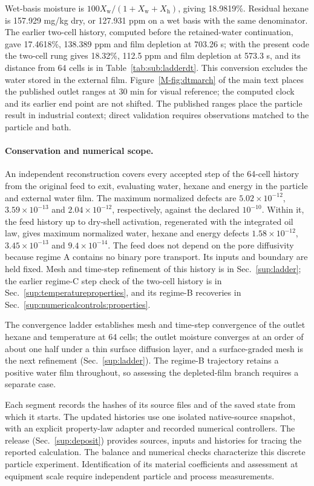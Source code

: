 Wet-basis moisture is $100X_{\mathrm w}/(1+X_{\mathrm w}+X_{\mathrm h})$,
giving 18.9819\%. Residual hexane is 157.929 mg/kg dry, or 127.931 ppm
on a wet basis with the same denominator. The earlier two-cell history,
computed before the retained-water continuation, gave 17.4618\%, 138.389 ppm and
film depletion at 703.26 s; with the present code the two-cell rung gives
18.32\%, 112.5 ppm and film depletion at 573.3 s, and its distance from
64 cells is in Table~\ref{tab:sub:ladderdt}. This conversion excludes the water
stored in the external film. Figure~\ref*{M-fig:dtmarch} of the main text
places the published outlet ranges at 30 min for visual reference; the
computed clock and its earlier end point are not shifted. The published ranges place the particle result in industrial context;
direct validation requires observations matched to the particle and bath.

\paragraph{Conservation and numerical scope.}
An independent reconstruction covers every accepted step of the 64-cell
history from the original feed to exit, evaluating water, hexane and
energy in the particle and external water film. The maximum normalized
defects are $5.02\times10^{-12}$, $3.59\times10^{-13}$ and
$2.04\times10^{-12}$, respectively, against the declared $10^{-10}$.
Within it, the feed history up to dry-shell activation, regenerated with
the integrated oil law, gives maximum normalized water, hexane and energy
defects $1.58\times10^{-12}$, $3.45\times10^{-13}$ and
$9.4\times10^{-14}$. The feed does not depend on the pore diffusivity
because regime A contains no binary pore transport. Its inputs and
boundary are held fixed.
Mesh and time-step refinement of this history is in Sec.~\ref{sup:ladder};
the earlier regime-C step check of the two-cell history is in
Sec.~\ref{sup:temperatureproperties}, and its regime-B recoveries in
Sec.~\ref{sup:numericalcontrols:properties}.

The convergence ladder establishes mesh and time-step convergence of the
outlet hexane and temperature at 64 cells; the outlet moisture converges
at an order of about one half under a thin surface diffusion layer, and a
surface-graded mesh is the next refinement (Sec.~\ref{sup:ladder}).
The regime-B trajectory retains a positive water film throughout, so assessing
the depleted-film branch requires a separate case.

Each segment records the hashes of its source files and of the saved
state from which it starts. The updated histories use one isolated native-source
snapshot, with an explicit property-law adapter and recorded numerical controllers. The release
(Sec.~\ref{sup:deposit}) provides sources, inputs and histories for tracing
the reported calculation. The balance and numerical checks characterize this
discrete particle experiment. Identification of its material coefficients
and assessment at equipment scale require independent particle and process
measurements.
